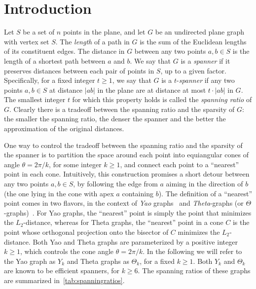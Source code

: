\documentclass[runningheads,a4paper]{llncs}
\begin{document}
\section{Introduction}
Let $S$ be a set of $n$ points in the plane, and let $G$ be an undirected plane graph with vertex set $S$. The \emph{length} of a path in $G$ is the sum of the Euclidean lengths of its constituent edges. The distance in $G$ between any two points $a, b \in S$ is the length of a shortest path between $a$ and $b$. We say that $G$ is a \emph{spanner} if it preserves distances between each pair of points in $S$, up to a given factor. Specifically, for a fixed integer $t \ge 1$, we say that $G$ is a $t$-\emph{spanner} if any two points $a, b \in S$ at distance $|ab|$ in the plane are at distance at most $t\cdot |ab|$ in $G$. The smallest integer $t$ for which this property holds is called the \emph{spanning ratio} of $G$. Clearly there is a tradeoff between the spanning ratio and the sparsity of $G$: the smaller the spanning ratio, the denser the spanner and the better the approximation of the original distances. 


One way to control the tradeoff between the spanning ratio and the sparsity of the spanner is to partition the space around each point into equiangular cones of angle $\theta=2\pi/k$, for some integer $k \ge 1$, and connect each point to a ``nearest'' point in each cone. Intuitively, this construction promises a short detour between any two points $a, b \in S$, by following the edge from $a$ aiming in the direction of $b$ (the one lying in the cone with apex $a$ containing $b$). 
The definition of a ``nearest'' point comes in two flavors, in the context of \emph{Yao} graphs~\cite{Yao82} and \emph{Theta}-graphs (or $\Theta$-graphs)~\cite{Clark87,Keil88}. For Yao graphs, the ``nearest'' point is simply the point that minimizes the $L_2$-distance, whereas for Theta graphs, the ``nearest'' point in a cone $C$ is the point whose orthogonal projection onto the bisector of $C$ minimizes the $L_2$-distance.  Both Yao and Theta graphs are parameterized by a positive integer $k \ge 1$, which controls the cone angle $\theta = 2\pi/k$. In the following we will refer to the Yao graph as $Y_k$ and Theta graphs as $\Theta_k$, for a fixed $k \ge 1$.  Both $Y_k$ and $\Theta_k$ are known to be efficient spanners, for $k \ge 6$. The spanning ratios of these graphs are summarized in~\autoref{tab:spanningratios}.
\end{document}
